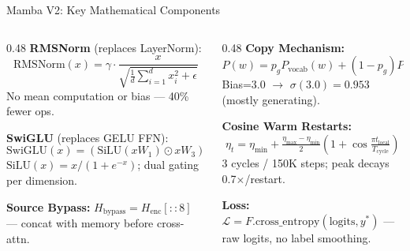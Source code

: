 \documentclass[10pt, aspectratio=169]{beamer}
\begin{document}
\begin{frame}{Mamba V2: Key Mathematical Components}
  \footnotesize
  \begin{columns}[T]
    \begin{column}{0.48\textwidth}
      \textbf{RMSNorm} (replaces LayerNorm):
      \vspace{-0.15cm}
      \begin{equation}
        \text{RMSNorm}(x) = \gamma \cdot \frac{x}{\sqrt{\frac{1}{d}\sum_{i=1}^{d} x_i^2 + \epsilon}} \nonumber
      \end{equation}
      \vspace{-0.3cm}
      {\scriptsize No mean computation or bias --- 40\% fewer ops.}

      \vspace{0.05cm}
      \textbf{SwiGLU} (replaces GELU FFN):
      \vspace{-0.15cm}
      \begin{equation}
        \text{SwiGLU}(x) = (\text{SiLU}(xW_1) \odot xW_3) W_2 \nonumber
      \end{equation}
      \vspace{-0.3cm}
      {\scriptsize $\text{SiLU}(x) = x/(1 + e^{-x})$; dual gating per dimension.}

      \vspace{0.05cm}
      \textbf{Source Bypass:}
      $H_{\text{bypass}} = H_{\text{enc}}[::8]$
      {\scriptsize --- concat with memory before cross-attn.}
    \end{column}
    \begin{column}{0.48\textwidth}
      \textbf{Copy Mechanism:}
      \vspace{-0.15cm}
      \begin{equation}
        P(w) = p_g P_{\text{vocab}}(w) + (1 {-} p_g) P_{\text{copy}}(w) \nonumber
      \end{equation}
      \vspace{-0.3cm}
      {\scriptsize Bias=3.0 $\rightarrow$ $\sigma(3.0)=0.953$ (mostly generating).}

      \vspace{0.05cm}
      \textbf{Cosine Warm Restarts:}
      \vspace{-0.15cm}
      \begin{equation}
        \eta_t = \eta_{\min} + \tfrac{\eta_{\max} - \eta_{\min}}{2}\!\left(1 + \cos\tfrac{\pi t_{\text{local}}}{T_{\text{cycle}}}\right) \nonumber
      \end{equation}
      \vspace{-0.3cm}
      {\scriptsize 3 cycles / 150K steps; peak decays 0.7$\times$/restart.}

      \vspace{0.05cm}
      \textbf{Loss:} $\mathcal{L} = F.\text{cross\_entropy}(\text{logits}, y^*)$
      {\scriptsize --- raw logits, no label smoothing.}
    \end{column}
  \end{columns}
\end{frame}
\end{document}
